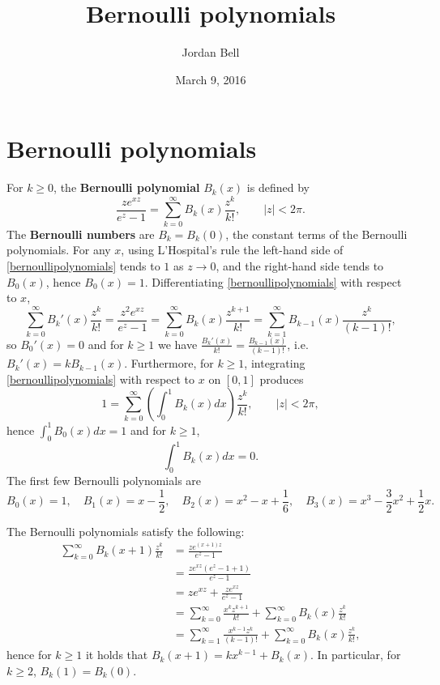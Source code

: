 \documentclass{article}
\theoremstyle{definition}
\theoremstyle{definition}
\begin{document}
\title{Bernoulli polynomials}
\author{Jordan Bell}
\date{March 9, 2016}

\maketitle

\section{Bernoulli polynomials}
For $k \geq 0$, the \textbf{Bernoulli polynomial} $B_k(x)$ is defined by
\begin{equation}
\frac{ze^{xz}}{e^z-1} = \sum_{k=0}^\infty B_k(x) \frac{z^k}{k!},\qquad |z|<2\pi.
\label{bernoullipolynomials}
\end{equation}
The \textbf{Bernoulli numbers} are $B_k = B_k(0)$, the constant terms of the Bernoulli polynomials.
For any $x$, using L'Hospital's rule the left-hand side of \eqref{bernoullipolynomials} tends to $1$ as $z \to 0$, and the right-hand side
tends to $B_0(x)$, hence $B_0(x)=1$. 
Differentiating \eqref{bernoullipolynomials} with respect to $x$,
\[
\sum_{k=0}^\infty B_k'(x) \frac{z^k}{k!} = \frac{z^2 e^{xz}}{e^z-1} = \sum_{k=0}^\infty B_k(x) \frac{z^{k+1}}{k!}
=\sum_{k=1}^\infty B_{k-1}(x) \frac{z^k}{(k-1)!},
\]
so $B_0'(x) = 0$ and for $k \geq 1$ we have $\frac{B_k'(x)}{k!} = \frac{B_{k-1}(x)}{(k-1)!}$, i.e.
$B_k'(x)=k B_{k-1}(x)$. Furthermore, for $k \geq 1$, integrating \eqref{bernoullipolynomials} with respect
to $x$ on $[0,1]$ produces
\[
1 = \sum_{k=0}^\infty \left( \int_0^1 B_k(x) dx \right) \frac{z^k}{k!},\qquad |z|<2\pi,
\]
hence $\int_0^1 B_0(x) dx =1$ and for $k \geq 1$,
\[
\int_0^1 B_k(x) dx = 0.
\] 
The first few Bernoulli polynomials are
\[
B_0(x)=1,\quad B_1(x) = x-\frac{1}{2},\quad B_2(x) = x^2-x+\frac{1}{6},
\quad B_3(x)=x^3-\frac{3}{2}x^2+\frac{1}{2}x.
\]


The Bernoulli polynomials  satisfy the following:
\begin{align*}
\sum_{k=0}^\infty B_k(x+1) \frac{z^k}{k!}&=\frac{ze^{(x+1)z}}{e^z-1}\\
&=\frac{ze^{xz} (e^z-1+1)}{e^z-1}\\
&=ze^{xz}+\frac{ze^{xz}}{e^z-1}\\
&=\sum_{k=0}^\infty \frac{x^k z^{k+1}}{k!} + \sum_{k=0}^\infty B_k(x) \frac{z^k}{k!}\\
&=\sum_{k=1}^\infty \frac{x^{k-1} z^k}{(k-1)!} +  \sum_{k=0}^\infty B_k(x) \frac{z^k}{k!},
\end{align*}
hence for $k \geq 1$ it holds that $B_k(x+1) = kx^{k-1} + B_k(x)$. In particular, for $k \geq 2$,
$B_k(1)=B_k(0)$.
\end{document}
